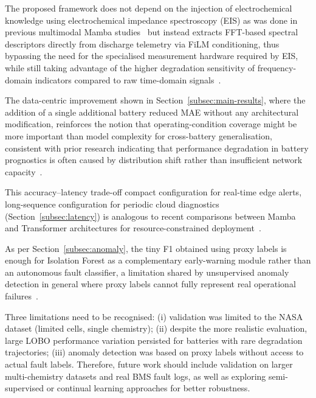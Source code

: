 The proposed framework does not depend on the injection of electrochemical
knowledge using electrochemical impedance spectroscopy (EIS) as was done in
previous multimodal Mamba studies~\cite{meng2026} but instead extracts FFT-based
spectral descriptors directly from discharge telemetry via FiLM conditioning,
thus bypassing the need for the specialised measurement hardware required by
EIS, while still taking advantage of the higher degradation sensitivity of
frequency-domain indicators compared to raw time-domain
signals~\cite{alsmadi2025,yang2023}.

The data-centric improvement shown in Section~\ref{subsec:main-results}, where
the addition of a single additional  battery reduced MAE without any
architectural modification, reinforces the notion that operating-condition
coverage might be more important than model complexity for cross-battery
generalisation, consistent with prior research indicating that performance
degradation in battery prognostics is often caused by distribution shift rather
than insufficient network capacity~\cite{meng2026,yang2023}.

This accuracy--latency trade-off compact configuration for real-time edge
alerts, long-sequence configuration for periodic cloud diagnostics
(Section~\ref{subsec:latency}) is analogous to recent comparisons between Mamba
and Transformer architectures for resource-constrained
deployment~\cite{olalde2024}.

As per Section~\ref{subsec:anomaly}, the tiny F1 obtained using proxy labels is
enough for Isolation Forest as a complementary early-warning module rather than
an autonomous fault classifier, a limitation shared by unsupervised anomaly
detection in general where proxy labels cannot fully represent real operational
failures~\cite{aljohani2026,arbaoui2024}.

Three limitations need to be recognised: (i) validation was limited to the NASA
dataset (limited cells, single chemistry); (ii) despite the more realistic
evaluation, large LOBO performance variation persisted for batteries with rare
degradation trajectories; (iii) anomaly detection was based on proxy labels
without access to actual fault labels. Therefore, future work should include
validation on larger multi-chemistry datasets and real BMS fault logs, as well
as exploring semi-supervised or continual learning approaches for better
robustness.
